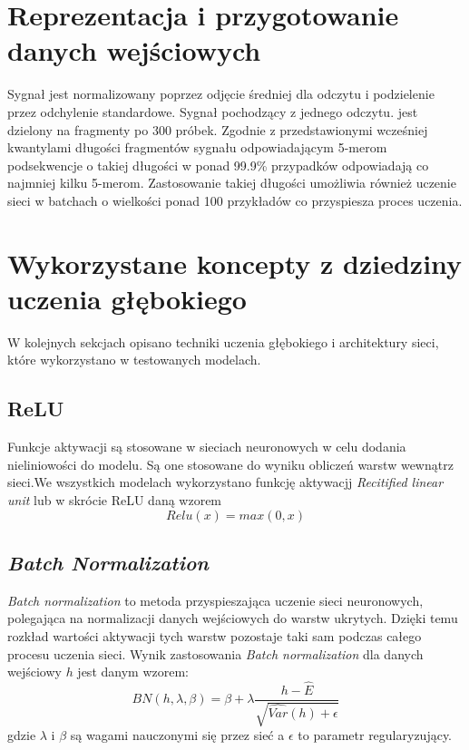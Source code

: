 \documentclass[a4paper,11pt,twoside]{report}
\theoremstyle{definition}
\begin{document}
\section{Reprezentacja i przygotowanie danych wejściowych}

Sygnał jest normalizowany poprzez odjęcie średniej dla odczytu i podzielenie przez odchylenie standardowe. Sygnał pochodzący z jednego odczytu. jest dzielony na fragmenty po 300 próbek. Zgodnie z przedstawionymi wcześniej kwantylami długości fragmentów sygnału odpowiadającym 5-merom podsekwencje o takiej długości w ponad 99.9\% przypadków odpowiadają co najmniej kilku 5-merom. Zastosowanie takiej długości umożliwia również uczenie sieci w batchach o wielkości ponad 100 przykładów co przyspiesza proces uczenia. 

\section{Wykorzystane koncepty z dziedziny uczenia głębokiego}

W kolejnych sekcjach opisano techniki uczenia głębokiego i architektury sieci, które wykorzystano w testowanych modelach.

\subsection{ReLU}

Funkcje aktywacji są stosowane w sieciach neuronowych w celu dodania nieliniowości do modelu. Są one stosowane do wyniku obliczeń warstw wewnątrz sieci.We wszystkich modelach wykorzystano funkcję aktywacjj \textit{Recitified linear unit} lub w skrócie ReLU daną wzorem
\[Relu(x) = max(0,x)\]

\subsection{\textit{Batch Normalization}}

\textit{Batch normalization} to metoda przyspieszająca uczenie sieci neuronowych, polegająca na normalizacji danych wejściowych do warstw ukrytych. Dzięki temu rozkład wartości aktywacji tych warstw pozostaje taki sam podczas całego procesu uczenia sieci. Wynik zastosowania \textit{Batch normalization } dla danych wejściowy $h$ jest danym wzorem:
\[BN(h, \lambda, \beta)=\beta+\lambda\frac{h-\hat{E}}{\sqrt{\hat{Var}(h)+\epsilon}}\]
gdzie $\lambda$ i $\beta$ są wagami nauczonymi się przez sieć a $\epsilon$ to parametr regularyzujący.
\end{document}
